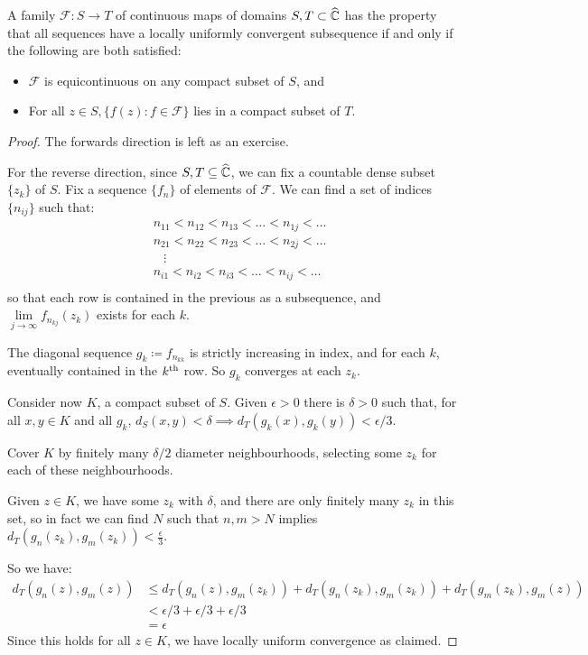 \documentclass[10pt,a4paper]{article}
\begin{document}
\begin{theorem}
  A family $\mathcal{F}: S \to T$ of continuous maps of domains $S, T \subset \widehat{\mathbb{C}}$ has the property that all sequences have a locally uniformly convergent subsequence if and only if the following are both satisfied:
  \begin{itemize}
    \item $\mathcal{F}$ is equicontinuous on any compact subset of $S$, and
    \item For all $z \in S, \{f(z):f \in \mathcal{F}\}$ lies in a compact subset of $T$.
  \end{itemize}
\end{theorem}
\begin{proof}
  The forwards direction is left as an exercise.

  For the reverse direction, since $S, T \subseteq \widehat{\mathbb{C}}$, we can fix a countable dense subset $\{z_k\}$ of $S$. Fix a sequence $\{f_n\}$ of elements of $\mathcal{F}$. We can find a set of indices $\{n_{ij}\}$ such that:
  \begin{align*}
    &n_{11} < n_{12} < n_{13} < \ldots < n_{1j} < \ldots\\
    &n_{21} < n_{22} < n_{23} < \ldots < n_{2j} < \ldots\\
    &\;\;\;\vdots\\
    &n_{i1} < n_{i2} < n_{i3} < \ldots < n_{ij} < \ldots\\
  \end{align*}
  so that each row is contained in the previous as a subsequence, and $\lim\limits_{j \to \infty} f_{n_{kj}}(z_k)$ exists for each $k$.

  The diagonal sequence $g_k \coloneqq f_{n_{kk}}$ is strictly increasing in index, and for each $k$, eventually contained in the $k\textsuperscript{th}$ row. So $g_k$ converges at each $z_k$.

  Consider now $K$, a compact subset of $S$. Given $\epsilon > 0$ there is $\delta >0$ such that, for all $x,y \in K$ and all $g_k$, $d_S(x, y) < \delta \implies d_T(g_k(x), g_k(y)) < \epsilon/3$.

  Cover $K$ by finitely many $\delta/2$ diameter neighbourhoods, selecting some $z_k$ for each of these neighbourhoods.

  Given $z \in K$, we have some $z_k$ with $\delta$, and there are only finitely many $z_k$ in this set, so in fact we can find $N$ such that $n, m > N$ implies $d_T(g_n(z_k), g_m(z_k)) < \frac{\epsilon}{3}$.

  So we have:
  \begin{align*}
    d_T(g_n(z), g_m(z)) &\leq d_T(g_n(z), g_m(z_k)) + d_T(g_n(z_k), g_m(z_k)) + d_T(g_m(z_k), g_m(z))\\
    &< \epsilon/3 + \epsilon/3 + \epsilon/3\\
    &= \epsilon
  \end{align*}
  Since this holds for all $z \in K$, we have locally uniform convergence as claimed.
\end{proof}
\end{document}
